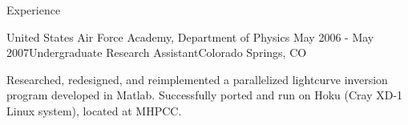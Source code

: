 \begin{rSection}{Experience}
  \begin{rSubsection}{United States Air Force Academy, Department of Physics}
    {May 2006 - May 2007}{Undergraduate Research Assistant}{Colorado Springs, CO}
  \item Researched, redesigned, and reimplemented a parallelized lightcurve inversion program developed in Matlab.
    Successfully ported and run on Hoku (Cray XD-1 Linux system), located at MHPCC.
  \end{rSubsection}


\end{rSection}
